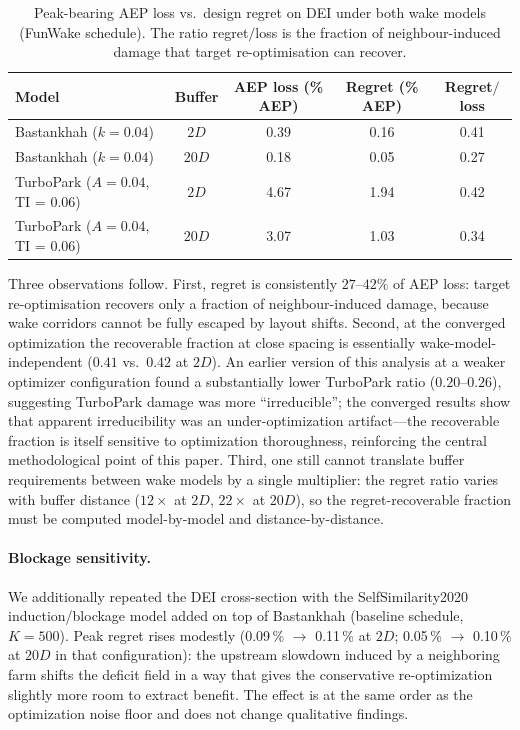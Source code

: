\documentclass[wes, manuscript]{copernicus}
\begin{document}
\begin{table}[htbp]
    \centering
    \caption{Peak-bearing AEP loss vs.\ design regret on DEI under both wake models (FunWake schedule).
    The ratio regret$/$loss is the fraction of neighbour-induced damage that target re-optimisation can recover.}
    \label{tab:loss-vs-regret}
    \begin{tabular}{lcccc}
        \toprule
        Model & Buffer & AEP loss (\% AEP) & Regret (\% AEP) & Regret$/$loss \\
        \midrule
        Bastankhah ($k = 0.04$)            & $2D$  & 0.39 & 0.16 & 0.41 \\
        Bastankhah ($k = 0.04$)            & $20D$ & 0.18 & 0.05 & 0.27 \\
        TurboPark ($A = 0.04$, TI = 0.06)  & $2D$  & 4.67 & 1.94 & 0.42 \\
        TurboPark ($A = 0.04$, TI = 0.06)  & $20D$ & 3.07 & 1.03 & 0.34 \\
        \bottomrule
    \end{tabular}
\end{table}

Three observations follow.
First, regret is consistently $27$--$42\%$ of AEP loss: target re-optimisation recovers only a fraction of neighbour-induced damage, because wake corridors cannot be fully escaped by layout shifts.
Second, at the converged optimization the recoverable fraction at close spacing is essentially wake-model-independent ($0.41$ vs.\ $0.42$ at $2D$).
An earlier version of this analysis at a weaker optimizer configuration found a substantially lower TurboPark ratio ($0.20$--$0.26$), suggesting TurboPark damage was more ``irreducible''; the converged results show that apparent irreducibility was an under-optimization artifact---the recoverable fraction is itself sensitive to optimization thoroughness, reinforcing the central methodological point of this paper.
Third, one still cannot translate buffer requirements between wake models by a single multiplier: the regret ratio varies with buffer distance ($12\times$ at $2D$, $22\times$ at $20D$), so the regret-recoverable fraction must be computed model-by-model and distance-by-distance.

\paragraph{Blockage sensitivity.}
We additionally repeated the DEI cross-section with the SelfSimilarity2020 induction/blockage model added on top of Bastankhah (baseline schedule, $K = 500$).
Peak regret rises modestly (0.09\,\% $\to$ 0.11\,\% at $2D$; 0.05\,\% $\to$ 0.10\,\% at $20D$ in that configuration): the upstream slowdown induced by a neighboring farm shifts the deficit field in a way that gives the conservative re-optimization slightly more room to extract benefit.
The effect is at the same order as the optimization noise floor and does not change qualitative findings.



\end{document}
